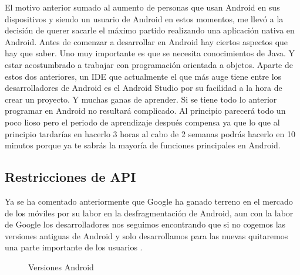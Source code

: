 El motivo anterior sumado al aumento de personas que usan Android en sus dispositivos y siendo un usuario de Android en estos momentos, me llevó a la decisión de querer sacarle el máximo partido realizando una aplicación nativa en Android.
Antes de comenzar a desarrollar en Android hay ciertos aspectos que hay que saber.
Uno muy importante es que se necesita conocimientos de Java.
Y estar acostumbrado a trabajar con programación orientada a objetos.
Aparte de estos dos anteriores, un IDE que actualmente el que más auge tiene entre los desarrolladores de Android es el Android Studio por su facilidad a la hora de crear un proyecto.
Y muchas ganas de aprender.
Si se tiene todo lo anterior programar en Android no resultará complicado. Al principio parecerá todo un poco lioso pero el periodo de aprendizaje después compensa ya que lo que al principio tardarías en hacerlo 3 horas al cabo de 2 semanas podrás hacerlo en 10 minutos porque ya te sabrás la mayoría de funciones principales en Android.


\subsection{Restricciones de API}
\label{subsecc:Restricciones de API}

Ya se ha comentado anteriormente que Google ha ganado terreno en el mercado de los móviles por su labor en la desfragmentación de Android, aun con la labor de Google los desarrolladores nos seguimos encontrando que si no cogemos las versiones antiguas de Android y solo desarrollamos para las nuevas quitaremos una parte importante de los usuarios \cite{dashboards}.

\begin{figure}[H] 
  \begin{center} 
    \caption{Versiones Android} 
    \label{fig:VersionesAndroid2} 
  \end{center} 
\end{figure}

